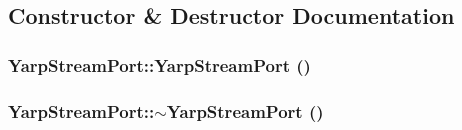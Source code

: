 \subsection{Constructor \& Destructor Documentation}
\hypertarget{class_yarp_stream_port_aa9bc88cfd89f533676960ba59629af84}{
\subsubsection[{YarpStreamPort}]{\setlength{\rightskip}{0pt plus 5cm}YarpStreamPort::YarpStreamPort ()}}
\label{class_yarp_stream_port_aa9bc88cfd89f533676960ba59629af84}
\hypertarget{class_yarp_stream_port_ac0923822f1b4ab48ef2fd7600184be98}{
\subsubsection[{$\sim$YarpStreamPort}]{\setlength{\rightskip}{0pt plus 5cm}YarpStreamPort::$\sim$YarpStreamPort ()}}
\label{class_yarp_stream_port_ac0923822f1b4ab48ef2fd7600184be98}


